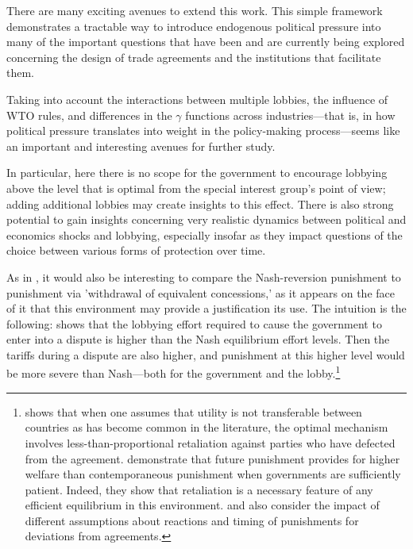 \documentclass[12pt]{article}
\newcommand{\ga}{\gamma}
\begin{document}
There are many exciting avenues to extend this work. This simple framework demonstrates a tractable way to introduce endogenous political pressure into many of the important questions that have been and are currently being explored concerning the design of trade agreements and the institutions that facilitate them.


Taking into account the interactions between multiple lobbies, the influence of WTO rules, and differences in the $\ga$ functions across industries---that is, in how political pressure translates into weight in the policy-making process---seems like an important and interesting avenues for further study.

In particular, here there is no scope for the government to encourage lobbying above the level that is optimal from the special interest group's point of view; adding additional lobbies may create insights to this effect. There is also strong potential to gain insights concerning very realistic dynamics between political and economics shocks and lobbying, especially insofar as they impact questions of the choice between various forms of protection over time.

As in \Textcite{zissimos}, it would also be interesting to compare the Nash-reversion punishment to punishment via 'withdrawal of equivalent concessions,' as it appears on the face of it that this environment may provide a justification its use. The intuition is the following: \Textcite{buzard2013a} shows that the lobbying effort required to cause the government to enter into a dispute is higher than the Nash equilibrium effort levels. Then the tariffs during a dispute are also higher, and punishment at this higher level would be more severe than Nash---both for the government and the lobby.\footnote{\Textcite{beshkar2010a} shows that when one assumes that utility is not transferable between countries as has become common in the literature, the optimal mechanism involves less-than-proportional retaliation against parties who have defected from the agreement. \Textcite{martinvergote} demonstrate that future punishment provides for higher welfare than contemporaneous punishment when governments are sufficiently patient. Indeed, they show that retaliation is a necessary feature of any efficient equilibrium in this environment. \Textcite{hungerford} and \Textcite{riezman1991} also consider the impact of different assumptions about reactions and timing of punishments for deviations from agreements.}
\end{document}
